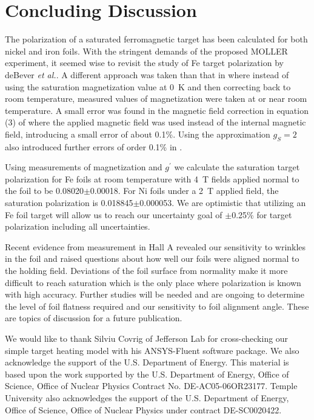 \documentclass[preprint,12pt]{elsarticle}
\begin{document}
{\section{Concluding Discussion}\label{conclusions}
The polarization of a saturated ferromagnetic target has been calculated for both nickel and iron foils. With the stringent demands of the proposed MOLLER experiment, it seemed wise to revisit the study of Fe target polarization by deBever {\it et al.}\cite{deBever1997}. A different approach was taken than that in \cite{deBever1997} where instead of using the saturation magnetization value at 0~K and then correcting back to room temperature, measured values of magnetization were taken at or near room temperature. A small error was found in the magnetic field correction in equation (3) of \cite{deBever1997} where the applied magnetic field was used instead of the internal magnetic field, introducing a small error of about 0.1\%. Using the approximation $g_S=2$ also introduced further errors of order 0.1\% in \cite{deBever1997}. 

Using measurements of magnetization and $g^\prime$ we calculate the saturation target polarization for Fe  foils at room temperature with 4~T fields applied normal to the foil to be 0.08020$\pm$0.00018. For Ni foils under a 2~T applied field, the saturation polarization is 0.018845$\pm$0.000053. We are optimistic that utilizing an Fe foil target will allow us to reach our uncertainty goal of $\pm$0.25\% for target polarization including all uncertainties.

Recent evidence from measurement in Hall A revealed our sensitivity to wrinkles in the foil and raised questions about how well our foils were aligned normal to the holding field. Deviations of the foil surface from normality make it more difficult to reach saturation which is the only place where polarization is known with high accuracy. Further studies will be needed and are ongoing to determine the level of foil flatness required and our sensitivity to foil alignment angle. These are topics of discussion for a future publication.

We would like to thank Silviu Covrig of Jefferson Lab for cross-checking our simple target heating model with his ANSYS-Fluent software package. We also acknowledge the support of the U.S. Department of Energy. This material is based upon the work supported by the U.S. Department of Energy, Office of Science, Office of Nuclear Physics Contract
No. DE-AC05-06OR23177. Temple University also acknowledges the support of the U.S. Department of Energy, Office of Science, Office of Nuclear Physics under contract  DE-SC0020422.
\FloatBarrier

}
\end{document}
